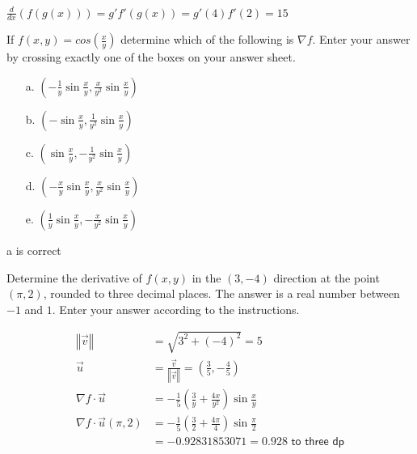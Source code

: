 \documentclass{uob-cs-exam}
\begin{document}
\begin{questions}
\droppoints

\begin{solution}
$\frac{d}{dx} \left( f(g(x)) \right) = g'f'(g(x))=g'(4)f'(2)=15$
\end{solution}

\question[2]
If $f(x,y)=cos\left( \frac{x}{y} \right)$ determine which of the following is $\nabla f$. Enter your answer by crossing exactly one of the boxes on your answer sheet.
\begin{itemize}
\item[a.] $\left( -\frac{1}{y}\sin \frac{x}{y} , \frac{x}{y^2} \sin \frac{x}{y}\right)$
\item[b.] $\left( -\sin \frac{x}{y} , \frac{1}{y^2} \sin \frac{x}{y}\right)$
\item[c.] $\left( \sin \frac{x}{y} , -\frac{1}{y^2} \sin \frac{x}{y}\right)$
\item[d.] $\left( -\frac{x}{y}\sin \frac{x}{y} , \frac{x}{y^2} \sin \frac{x}{y}\right)$
\item[e.] $\left( \frac{1}{y}\sin \frac{x}{y} , -\frac{x}{y^2} \sin \frac{x}{y}\right)$
\end{itemize}

\droppoints

\begin{solution}
a is correct
\end{solution}

\question[3] 
Determine the derivative of $f(x,y)$ in the $\left( 3,-4\right)$ direction at the point $\left(\pi, 2 \right)$, rounded to three decimal places. The answer is a real number between $-1$ and $1$. Enter your answer according to the instructions.

\droppoints

\begin{solution}
\begin{align*}
  \left\Vert \vec{v} \right\Vert &= \sqrt{3^2+(-4)^2} = 5\\
  \vec{u} &= \frac{\vec{v}}{\left\Vert \vec{v} \right\Vert} = \left( \frac{3}{5}, -\frac{4}{5}\right)\\
  \nabla f \cdot \vec{u} &= - \frac{1}{5} \left( \frac{3}{y} + \frac{4x}{y^2}\right) \sin \frac{x}{y}\\
    \nabla f \cdot \vec{u} \left( \pi, 2 \right) &= - \frac{1}{5} \left( \frac{3}{2} + \frac{4 \pi}{4}\right) \sin \frac{\pi}{2}\\
    &= -0.92831853071 = 0.928 \textsf{ to three dp}
\end{align*}
\end{solution}


\end{questions}
\end{document}
